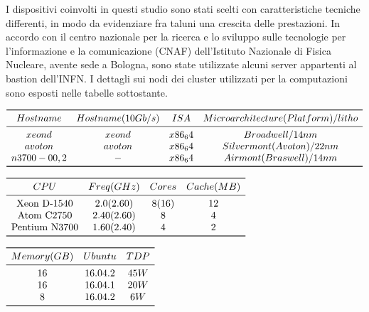 I dispositivi coinvolti in questi studio sono stati scelti con caratteristiche tecniche differenti, in modo da evidenziare fra taluni una crescita delle prestazioni.
In accordo con il centro nazionale per la ricerca e lo sviluppo sulle tecnologie per l'informazione e la comunicazione (CNAF) dell'Istituto Nazionale di Fisica Nucleare, avente sede a Bologna, sono state utilizzate alcuni server appartenti al bastion dell'INFN.
I dettagli sui nodi dei cluster utilizzati per la computazioni sono esposti nelle tabelle sottostante.
\begin{table}
\centering
$\begin{array}{*{4}{c}}
	\toprule
		Hostname & Hostname(10Gb/s) & ISA & Microarchitecture(Platform)/litho \\
	\midrule
		xeond & xeond & x86_64 & Broadwell/14nm \\
		avoton & avoton & x86_64 & Silvermont(Avoton)/22nm \\
		n3700-0{0,2} & - & x86_64 & Airmont(Braswell)/14nm \\
	\bottomrule
\end{array}$
\caption{}
\end{table}

\begin{table}
\centering
$\begin{array}{*{4}{c}}
	\toprule
		CPU & Freq(GHz) & Cores & Cache(MB)\\
	\midrule
		\text{Xeon D-1540} & 2.0(2.60) & 8(16) & 12 \\
		\text{Atom C2750} & 2.40(2.60) & 8 & 4 \\
		\text{Pentium N3700} & 1.60(2.40) & 4 & 2 \\
	\bottomrule
\end{array}$
\caption{}
\end{table}

\begin{table}
\centering
$\begin{array}{*{4}{c}}
	\toprule
		Memory(GB) & Ubuntu & TDP \\
	\midrule
		16 & 16.04.2 & 45W \\
		16 & 16.04.1 & 20W \\
		8 & 16.04.2 & 6W \\
	\bottomrule
\end{array}$
\caption{}
\end{table}


